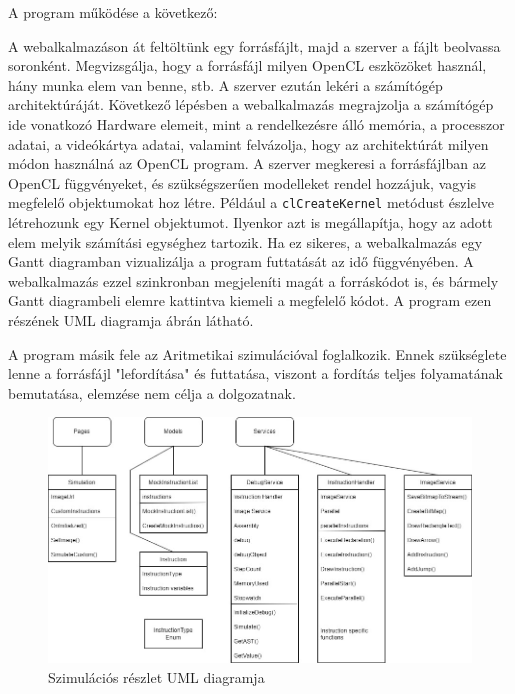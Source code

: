A program működése a következő:

A webalkalmazáson át feltöltünk egy forrásfájlt, majd a szerver a fájlt beolvassa soronként. Megvizsgálja, hogy a forrásfájl milyen OpenCL eszközöket használ, hány munka elem van benne, stb. A szerver ezután lekéri a számítógép architektúráját. Következő lépésben a webalkalmazás megrajzolja a számítógép ide vonatkozó Hardware elemeit, mint a rendelkezésre álló memória, a processzor adatai, a videókártya adatai, valamint felvázolja, hogy az architektúrát milyen módon használná az OpenCL program. A szerver megkeresi a forrásfájlban az OpenCL függvényeket, és szükségszerűen modelleket rendel hozzájuk, vagyis megfelelő objektumokat hoz létre. Például a \texttt{clCreateKernel} metódust észlelve létrehozunk egy Kernel objektumot. Ilyenkor azt is megállapítja, hogy az adott elem melyik számítási egységhez tartozik. Ha ez sikeres, a webalkalmazás egy Gantt diagramban vizualizálja a program futtatását az idő függvényében. A webalkalmazás ezzel szinkronban megjeleníti magát a forráskódot is, és bármely Gantt diagrambeli elemre kattintva kiemeli a megfelelő kódot. A program ezen részének UML diagramja  ábrán látható.

A program másik fele az Aritmetikai szimulációval foglalkozik. Ennek szükséglete lenne a forrásfájl "lefordítása" és futtatása, viszont a fordítás teljes folyamatának bemutatása, elemzése nem célja a dolgozatnak.

\begin{figure}[h]
\centering
\includegraphics[scale=0.4]{images/SimUML.jpg}
\caption{Szimulációs részlet UML diagramja}
\label{fig:simUML}
\end{figure}

